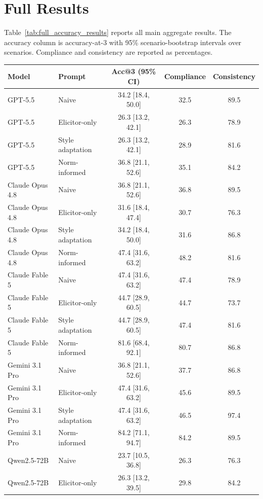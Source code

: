 \documentclass[twocolumn,10pt]{article}
\begin{document}
\section{Full Results}
\label{app:full_results}

Table~\ref{tab:full_accuracy_results} reports all main aggregate results. The
accuracy column is accuracy-at-3 with 95\% scenario-bootstrap intervals over
scenarios. Compliance and consistency are reported as percentages.

\begin{table}[htbp]
\centering
\small
\begin{tabular}{llccc}
\toprule
Model & Prompt & Acc@3 (95\% CI) & Compliance & Consistency \\
\midrule
GPT-5.5 & Naive & 34.2 [18.4, 50.0] & 32.5 & 89.5 \\
GPT-5.5 & Elicitor-only & 26.3 [13.2, 42.1] & 26.3 & 78.9 \\
GPT-5.5 & Style adaptation & 26.3 [13.2, 42.1] & 28.9 & 81.6 \\
GPT-5.5 & Norm-informed & 36.8 [21.1, 52.6] & 35.1 & 84.2 \\
Claude Opus 4.8 & Naive & 36.8 [21.1, 52.6] & 36.8 & 89.5 \\
Claude Opus 4.8 & Elicitor-only & 31.6 [18.4, 47.4] & 30.7 & 76.3 \\
Claude Opus 4.8 & Style adaptation & 34.2 [18.4, 50.0] & 31.6 & 86.8 \\
Claude Opus 4.8 & Norm-informed & 47.4 [31.6, 63.2] & 48.2 & 81.6 \\
Claude Fable 5 & Naive & 47.4 [31.6, 63.2] & 47.4 & 78.9 \\
Claude Fable 5 & Elicitor-only & 44.7 [28.9, 60.5] & 44.7 & 73.7 \\
Claude Fable 5 & Style adaptation & 44.7 [28.9, 60.5] & 47.4 & 81.6 \\
Claude Fable 5 & Norm-informed & 81.6 [68.4, 92.1] & 80.7 & 86.8 \\
Gemini 3.1 Pro & Naive & 36.8 [21.1, 52.6] & 37.7 & 86.8 \\
Gemini 3.1 Pro & Elicitor-only & 47.4 [31.6, 63.2] & 45.6 & 89.5 \\
Gemini 3.1 Pro & Style adaptation & 47.4 [31.6, 63.2] & 46.5 & 97.4 \\
Gemini 3.1 Pro & Norm-informed & 84.2 [71.1, 94.7] & 84.2 & 89.5 \\
Qwen2.5-72B & Naive & 23.7 [10.5, 36.8] & 26.3 & 76.3 \\
Qwen2.5-72B & Elicitor-only & 26.3 [13.2, 39.5] & 29.8 & 84.2 \\

\end{tabular}
\end{table}
\end{document}
